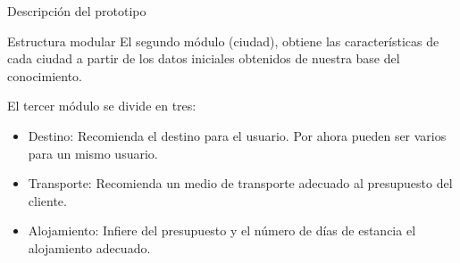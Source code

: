 \documentclass[11pt, a4paper, spanish, openright, twoside]{book}
\begin{document}
\begin{section}{Descripción del prototipo}
\begin{subsection}{Estructura modular}
	El segundo módulo (ciudad), obtiene las características de cada ciudad a partir de los datos iniciales obtenidos de nuestra base del conocimiento.
	
	El tercer módulo se divide en tres:
	\begin{itemize}
		\item Destino: Recomienda el destino para el usuario. Por ahora pueden ser varios para un mismo usuario.
		\item Transporte: Recomienda un medio de transporte adecuado al presupuesto del cliente.
		\item Alojamiento: Infiere del presupuesto y el número de días de estancia el alojamiento adecuado.
	\end{itemize}
	
	\end{subsection}
\end{section}
	\newpage
\end{document}
